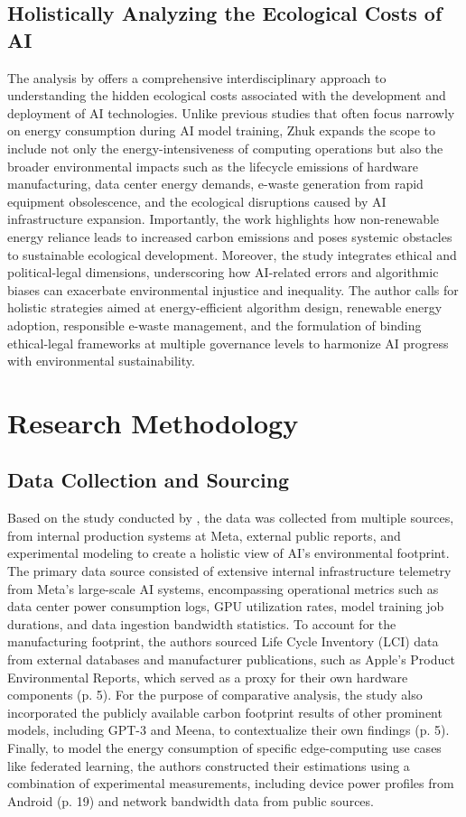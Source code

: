\documentclass[a4paper, 12pt]{article}
\begin{document}
\subsection{Holistically Analyzing the Ecological Costs of AI}
\hspace{24pt}The analysis by \citet{Zhuk2023} offers a comprehensive interdisciplinary approach to understanding the hidden ecological costs associated with the development and deployment of AI technologies. Unlike previous studies that often focus narrowly on energy consumption during AI model training, Zhuk expands the scope to include not only the energy-intensiveness of computing operations but also the broader environmental impacts such as the lifecycle emissions of hardware manufacturing, data center energy demands, e-waste generation from rapid equipment obsolescence, and the ecological disruptions caused by AI infrastructure expansion. Importantly, the work highlights how non-renewable energy reliance leads to increased carbon emissions and poses systemic obstacles to sustainable ecological development. Moreover, the study integrates ethical and political-legal dimensions, underscoring how AI-related errors and algorithmic biases can exacerbate environmental injustice and inequality. The author calls for holistic strategies aimed at energy-efficient algorithm design, renewable energy adoption, responsible e-waste management, and the formulation of binding ethical-legal frameworks at multiple governance levels to harmonize AI progress with environmental sustainability.

\section{Research Methodology}
\subsection{Data Collection and Sourcing}
\hspace{24pt}Based on the study conducted by \citet{Wu2022}, the data was collected from multiple sources, from internal production systems at Meta, external public reports, and experimental modeling to create a holistic view of AI's environmental footprint. The primary data source consisted of extensive internal infrastructure telemetry from Meta's large-scale AI systems, encompassing operational metrics such as data center power consumption logs, GPU utilization rates, model training job durations, and data ingestion bandwidth statistics. To account for the manufacturing footprint, the authors sourced Life Cycle Inventory (LCI) data from external databases and manufacturer publications, such as Apple's Product Environmental Reports, which served as a proxy for their own hardware components (p. 5). For the purpose of comparative analysis, the study also incorporated the publicly available carbon footprint results of other prominent models, including GPT-3 and Meena, to contextualize their own findings (p. 5). Finally, to model the energy consumption of specific edge-computing use cases like federated learning, the authors constructed their estimations using a combination of experimental measurements, including device power profiles from Android (p. 19) and network bandwidth data from public sources.
\end{document}
